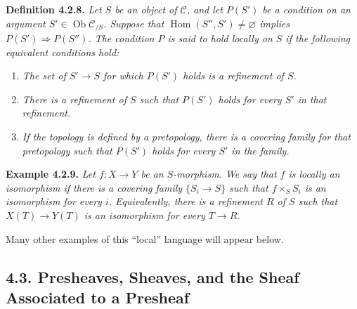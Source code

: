 \medskip
\noindent{}\textbf{Definition 4.2.8.}
\textit{Let \(S\) be an object of \(\mathscr C\), and let \(P(S')\) be a
condition on an argument
\(S'\in\operatorname{Ob}\mathscr C_{/S}\). Suppose that
\(\operatorname{Hom}(S'',S')\ne\varnothing\) implies
\(P(S')\Rightarrow P(S'')\). The condition \(P\) is said to hold
\emph{locally on \(S\)} if the
following equivalent conditions hold:}
\begin{enumerate}
 \item[(i)] \textit{The set of \(S'\to S\) for which \(P(S')\) holds is a
 refinement of \(S\).}
 \item[(ii)] \textit{There is a refinement of \(S\) such that \(P(S')\)
 holds for every \(S'\) in that refinement.}
 \item[(iii)] \textit{If the topology is defined by a pretopology, there
 is a covering family for that pretopology such that \(P(S')\) holds for
 every \(S'\) in the family.}
\end{enumerate}

\medskip
\noindent{}\textbf{Example 4.2.9.}
\textit{Let \(f:X\to Y\) be an \(S\)-morphism. We say that \(f\) is
\emph{locally an isomorphism} if there is a covering family
\(\{S_i\to S\}\) such that \(f\times_SS_i\) is an isomorphism for every
\(i\). Equivalently, there is a refinement \(R\) of \(S\) such that
\(X(T)\to Y(T)\) is an isomorphism for every \(T\to R\).}

Many other examples of this ``local'' language will appear below.

\subsection*{4.3. Presheaves, Sheaves, and the Sheaf Associated to a Presheaf}

